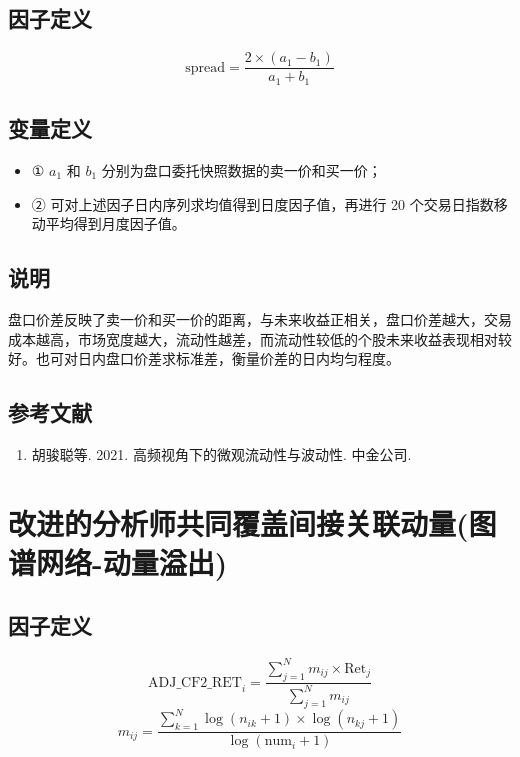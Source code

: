 \documentclass{article}
\begin{document}
\subsection{因子定义}
\begin{equation}
    \mathrm{spread} = \frac{2 \times (a_1 - b_1)}{a_1 + b_1}
\end{equation}

\subsection{变量定义}
\begin{itemize}
    \item ① \( a_1 \) 和 \( b_1 \) 分别为盘口委托快照数据的卖一价和买一价；
    \item ② 可对上述因子日内序列求均值得到日度因子值，再进行 20 个交易日指数移动平均得到月度因子值。
\end{itemize}

\subsection{说明}
盘口价差反映了卖一价和买一价的距离，与未来收益正相关，盘口价差越大，交易成本越高，市场宽度越大，流动性越差，而流动性较低的个股未来收益表现相对较好。也可对日内盘口价差求标准差，衡量价差的日内均匀程度。

\subsection{参考文献}
\begin{enumerate}
    \item 胡骏聪等. 2021. 高频视角下的微观流动性与波动性. 中金公司.
\end{enumerate}

\section{改进的分析师共同覆盖间接关联动量(图谱网络-动量溢出)}

\subsection{因子定义}
\begin{equation}
    \mathrm{ADJ\_CF2\_RET}_i = \frac{\sum_{j=1}^{N} m_{ij} \times \mathrm{Ret}_j}{\sum_{j=1}^{N} m_{ij}}
\end{equation}
\begin{equation}
    m_{ij} = \frac{\sum_{k=1}^{N} \log(n_{ik} + 1) \times \log(n_{kj} + 1)}{\log(\mathrm{num}_i + 1)}
\end{equation}
\end{document}
